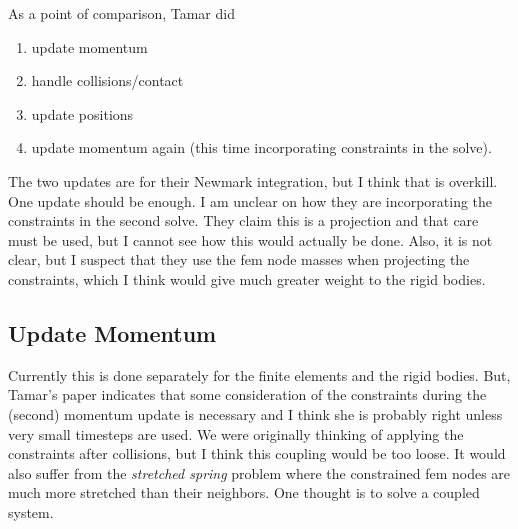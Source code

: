 \documentclass[review]{acmsiggraph-job}
\begin{document}
As a point of comparison, Tamar did 
\begin{enumerate}
\item update momentum
\item handle collisions/contact
\item update positions
\item update momentum again (this time incorporating constraints in the solve).
\end{enumerate}
The two updates are for their Newmark integration, but I think that is overkill.  One update should be enough.
I am unclear on how they are incorporating the constraints in the second solve.  They claim this is a
projection and that care must be used, but I cannot see how this would actually be done.  Also,
it is not clear, but I suspect that they use the fem node masses when projecting the constraints, which
I think would give much greater weight to the rigid bodies.

\subsection{Update Momentum}
Currently this is done separately for the finite elements and the rigid bodies.  But, Tamar's paper
indicates that some consideration of the constraints during the (second) momentum update is necessary
and I think she is probably right unless very small timesteps are used.  We were originally thinking 
of applying the constraints after collisions, but I think this coupling would be too loose.  It would also
suffer from the {\em stretched spring} problem where the constrained fem nodes are much more stretched than
their neighbors.  One thought is to solve a coupled system.  
\end{document}
